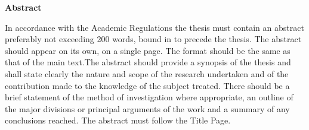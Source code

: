 \begin{center}
\LARGE\textbf {Abstract}
\end{center}
\vspace{5pt}

\noindent
In accordance with the Academic Regulations the thesis must contain an abstract preferably not exceeding 200 words, bound in to precede the thesis. The abstract should appear on its own, on a single page.  The format should be the same as that of the main text.The abstract should provide a synopsis of the thesis and shall state clearly the nature and scope of the research undertaken and of the contribution made to the knowledge of the subject treated. There should be a brief statement of the method of investigation where appropriate, an outline of the major divisions or principal arguments of the work and a summary of any conclusions reached. The abstract must follow the Title Page.